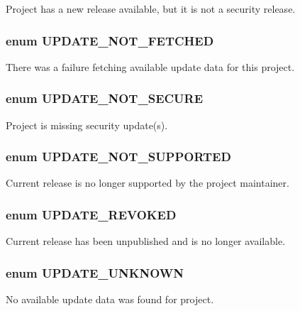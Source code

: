 \label{update_8module_a1cf8c4b62d552b0c62ae317040760744}
Project has a new release available, but it is not a security release. \hypertarget{update_8module_a2cc9d3de7448a0dc6fe7a74e76fda1ac}{
\subsubsection[{UPDATE\_\-NOT\_\-FETCHED}]{\setlength{\rightskip}{0pt plus 5cm}enum {\bf UPDATE\_\-NOT\_\-FETCHED}}}
\label{update_8module_a2cc9d3de7448a0dc6fe7a74e76fda1ac}
There was a failure fetching available update data for this project. \hypertarget{update_8module_ac41501f4ca3307cc81bbabbcf6139b61}{
\subsubsection[{UPDATE\_\-NOT\_\-SECURE}]{\setlength{\rightskip}{0pt plus 5cm}enum {\bf UPDATE\_\-NOT\_\-SECURE}}}
\label{update_8module_ac41501f4ca3307cc81bbabbcf6139b61}
Project is missing security update(s). \hypertarget{update_8module_a553f353b4e62f532ea5cb95a827421ac}{
\subsubsection[{UPDATE\_\-NOT\_\-SUPPORTED}]{\setlength{\rightskip}{0pt plus 5cm}enum {\bf UPDATE\_\-NOT\_\-SUPPORTED}}}
\label{update_8module_a553f353b4e62f532ea5cb95a827421ac}
Current release is no longer supported by the project maintainer. \hypertarget{update_8module_ae81bb81453c1ad2b97544aa1ccbe1b0c}{
\subsubsection[{UPDATE\_\-REVOKED}]{\setlength{\rightskip}{0pt plus 5cm}enum {\bf UPDATE\_\-REVOKED}}}
\label{update_8module_ae81bb81453c1ad2b97544aa1ccbe1b0c}
Current release has been unpublished and is no longer available. \hypertarget{update_8module_a00865274cb5f17217b9a4f137fe33609}{
\subsubsection[{UPDATE\_\-UNKNOWN}]{\setlength{\rightskip}{0pt plus 5cm}enum {\bf UPDATE\_\-UNKNOWN}}}
\label{update_8module_a00865274cb5f17217b9a4f137fe33609}
No available update data was found for project. 

